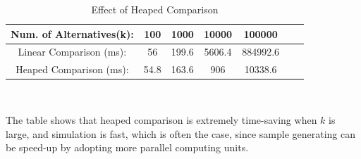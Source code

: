 \begin{table}[ht]
\begin{center}
\begin{tabular}{|c|c|c|c|c|c|c|}
\hline
Num. of Alternatives(k): & 100 & 1000 & 10000 & 100000 \\
\hline
Linear Comparison (ms): & 56 & 199.6 & 5606.4 & 884992.6 \\
\hline
Heaped Comparison (ms): & 54.8 & 163.6 & 906 & 10338.6 \\
\hline
\end{tabular} \\
\caption{Effect of Heaped Comparison}
\end{center}
\end{table}

The table shows that heaped comparison is extremely time-saving when $k$ is large, and simulation is fast, which is often the case, since sample generating can be speed-up by adopting more parallel computing units.
